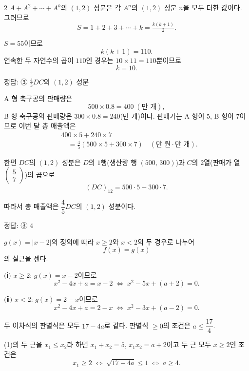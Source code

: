 \documentclass[10pt]{article}
\begin{document}
\begin{multicols}{2}
$A + A^2 + \cdots + A^k$의 $(1, 2)$ 성분은 각 $A^n$의 $(1, 2)$ 성분 $n$을 모두 더한 값이다. 그러므로
\[ S = 1 + 2 + 3 + \cdots + k = \tfrac{k(k+1)}{2}. \]

$S = 55$이므로
\[ k(k+1) = 110. \]
연속한 두 자연수의 곱이 $110$인 경우는 $10 \times 11 = 110$뿐이므로
\[ k = 10. \]

\begin{answerbox}정답: ③ $\tfrac{4}{5}DC$의 $(1, 2)$ 성분\end{answerbox}

A 형 축구공의 판매량은
\[ 500 \times 0.8 = 400 \; (\text{만 개}), \]
B 형 축구공의 판매량은 $300 \times 0.8 = 240$(만 개)이다. 판매가는 A 형이 $5$, B 형이 $7$이므로 이번 달 총 매출액은
\begin{align*}
&400 \times 5 + 240 \times 7 \\
&\quad = \tfrac{4}{5}(500 \times 5 + 300 \times 7)\quad (\text{만 원}\cdot\text{만 개}).
\end{align*}

한편 $DC$의 $(1, 2)$ 성분은 $D$의 $1$행(생산량 행 $(500,\,300)$)과 $C$의 $2$열(판매가 열 $\begin{pmatrix} 5 \\ 7 \end{pmatrix}$)의 곱으로
\[ (DC)_{12} = 500 \cdot 5 + 300 \cdot 7. \]

따라서 총 매출액은 $\dfrac{4}{5} DC$의 $(1, 2)$ 성분이다.

\begin{answerbox}정답: ③ $4$\end{answerbox}

$g(x) = |x - 2|$의 정의에 따라 $x \ge 2$와 $x < 2$의 두 경우로 나누어
\[ f(x) = g(x) \]
의 실근을 센다.

$(\!$ⅰ$)$ $x \ge 2$: $g(x) = x - 2$이므로
\[ x^2 - 4x + a = x - 2 \;\Longleftrightarrow\; x^2 - 5x + (a + 2) = 0. \tag{1} \]

$(\!$ⅱ$)$ $x < 2$: $g(x) = 2 - x$이므로
\[ x^2 - 4x + a = 2 - x \;\Longleftrightarrow\; x^2 - 3x + (a - 2) = 0. \tag{2} \]

두 이차식의 판별식은 모두 $17 - 4a$로 같다. 판별식 $\ge 0$의 조건은 $a \le \dfrac{17}{4}$.

(1)의 두 근을 $x_1 \le x_2$라 하면 $x_1 + x_2 = 5$, $x_1 x_2 = a + 2$이고 두 근 모두 $x \ge 2$인 조건은
\[ x_1 \ge 2 \;\Longleftrightarrow\; \sqrt{17 - 4a} \le 1 \;\Longleftrightarrow\; a \ge 4. \]


\end{multicols}
\end{document}
